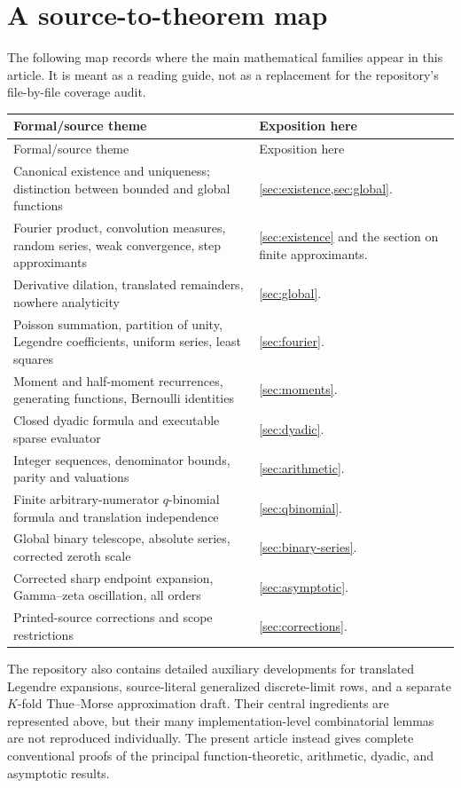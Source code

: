 \documentclass[11pt]{article}
\numberwithin{equation}{section}
\theoremstyle{definition}
\theoremstyle{remark}
\begin{document}
\section{A source-to-theorem map}\label{app:source-map}

The following map records where the main mathematical families appear in this
article.  It is meant as a reading guide, not as a replacement for the
repository's file-by-file coverage audit.

\begin{longtable}{p{}p{}}
\toprule
Formal/source theme & Exposition here\\
\midrule
\endfirsthead
\toprule
Formal/source theme & Exposition here\\
\midrule
\endhead
Canonical existence and uniqueness; distinction between bounded and global
functions & \cref{sec:existence,sec:global}.\\
Fourier product, convolution measures, random series, weak convergence, step
approximants & \cref{sec:existence} and the section on finite approximants.\\
Derivative dilation, translated remainders, nowhere analyticity &
\cref{sec:global}.\\
Poisson summation, partition of unity, Legendre coefficients, uniform series,
least squares & \cref{sec:fourier}.\\
Moment and half-moment recurrences, generating functions, Bernoulli identities
& \cref{sec:moments}.\\
Closed dyadic formula and executable sparse evaluator & \cref{sec:dyadic}.\\
Integer sequences, denominator bounds, parity and valuations &
\cref{sec:arithmetic}.\\
Finite arbitrary-numerator $q$-binomial formula and translation independence &
\cref{sec:qbinomial}.\\
Global binary telescope, absolute series, corrected zeroth scale &
\cref{sec:binary-series}.\\
Corrected sharp endpoint expansion, Gamma--zeta oscillation, all orders &
\cref{sec:asymptotic}.\\
Printed-source corrections and scope restrictions & \cref{sec:corrections}.\\
\bottomrule
\end{longtable}

The repository also contains detailed auxiliary developments for translated
Legendre expansions, source-literal generalized discrete-limit rows, and a
separate $K$-fold Thue--Morse approximation draft.  Their central ingredients
are represented above, but their many implementation-level combinatorial
lemmas are not reproduced individually.  The present article instead gives
complete conventional proofs of the principal function-theoretic, arithmetic,
dyadic, and asymptotic results.
\end{document}
